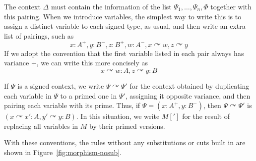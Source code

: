 \documentclass{amsart}
\def\p{^+} %
\def\m{^-}
\newcommand{\strto}{\curvearrowright}
\theoremstyle{definition}
\begin{document}
The context $\Delta$ must contain the information of the list $\Psi_1,\dots,\Psi_n,\Phi$ together with this pairing.
When we introduce variables, the simplest way to write this is to assign a distinct variable to each signed type, as usual, and then write an extra list of pairings, such as
\[ x:A\p, y:B\m, z:B\p, w:A\m, x\strto w, z\strto y \]
If we adopt the convention that the first variable listed in each pair always has variance $+$, we can write this more concisely as
\[ x\strto w:A, z\strto y:B \]

If $\Psi$ is a signed context, we write $\Psi\strto\Psi'$ for the context obtained by duplicating each variable in $\Psi$ to a primed one in $\Psi'$, assigning it opposite variance, and then pairing each variable with its prime.
Thus, if $\Psi= (x:A\p,y:B\m)$, then $\Psi\strto\Psi'$ is $(x\strto x':A, y'\strto y:B)$.
In this situation, we write $M[']$ for the result of replacing all variables in $M$ by their primed versions.

With these conventions, the rules without any substitutions or cuts built in are shown in Figure~\ref{fig:morphism-nosub}.
\end{document}
